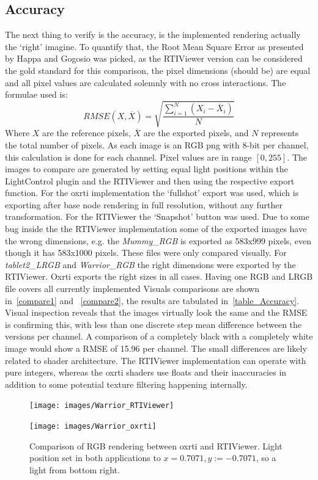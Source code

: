 \subsection{Accuracy}
The next thing to verify is the accuracy, is the implemented rendering actually
the `right' imagine. To quantify that, the Root Mean Square Error as presented
by Happa and Gogosio\cite*{gogioso_pbr:_2017} was picked, as the RTIViewer
version can be considered the gold standard for this comparison, the pixel dimensions
(should be) are equal and all pixel values are calculated solemnly with no cross
interactions. The formulae used is:
$$RMSE(X, \overline X )= \sqrt{\frac{\sum_{i=1}^{N} (X_{i}-\overline
    X_{i})}{N}}$$
Where $X$ are the reference pixels, $\overline X$ are the exported pixels, and
$N$ represents the total number of pixels. As each image is an RGB png with
8-bit per channel, this calculation is done for each channel. Pixel values are
in range $[0, 255]$. The images to compare are generated by setting equal light
positions within the LightControl plugin and the RTIViewer and then using the
respective export function. For the oxrti implementation the `fullshot' export
was used, which is exporting after base node rendering in full resolution,
without any further transformation. For the RTIViewer the `Snapshot' button was
used. Due to some bug inside the the RTIViewer implementation some of the
exported images have the wrong dimensions, e.g. the \emph{Mummy\_RGB} is exported
as 583x999 pixels, even though it has 583x1000 pixels. These files were only
compared visually. For \emph{tablet2\_LRGB} and \emph{Warrior\_RGB} the right
dimensions were exported by the RTIViewer. Oxrti exports the right sizes in all
cases. Having one RGB and LRGB file covers all currently implemented  Visuals
comparisons are shown in~\autoref{compare1} and ~\autoref{compare2}, the results
are tabulated in~\autoref{table_Accuracy}. Visual inspection reveals that the
images virtually look the same and the RMSE is confirming this, with less than
one discrete step mean difference between the versions per channel. A
comparison of a completely black with a completely white image would show a RMSE
of 15.96 per channel. The small differences are likely related to shader
architecture. The RTIViewer implementation can operate with pure integers,
whereas the oxrti shaders use floats and their inaccuracies in addition to some
potential texture filtering happening internally.

\begin{figure}
\begin{subfloat}{\texttt{[image: images/Warrior\_RTIViewer]}}\end{subfloat}
\begin{subfloat}{\texttt{[image: images/Warrior\_oxrti]}}\end{subfloat}
\caption[Warrior Comparison]{Comparison of RGB rendering between oxrti and RTIViewer. Light position
set in both applications to $x=0.7071, y:=-0.7071$, so a light from bottom right.}
\label{compare1}
\end{figure}

